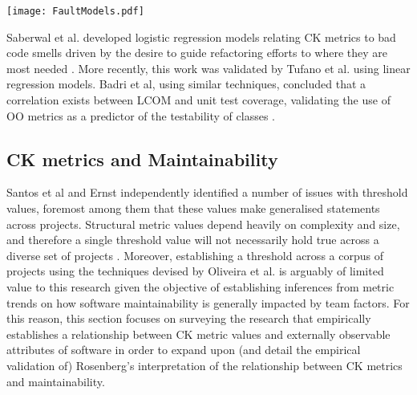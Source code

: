 \begin{table}
\begin{tabular}
 \centering 
 \texttt{[image: FaultModels.pdf]}
 \label{tab:FaultModels}
\end{tabular}
\end{table}

Saberwal et al. developed logistic regression models relating CK metrics to bad code smells driven by the desire to guide refactoring efforts to where they are most needed \citep{saberwal2013empirical}. More recently, this work was validated by Tufano et al. \citep{tufano2017and} using linear regression models. Badri et al, using similar techniques, concluded that a correlation exists between LCOM and unit test coverage, validating the use of OO metrics as a predictor of the testability of classes \citep{badri2011empirical}.

\subsection{CK metrics and Maintainability}
Santos et al and Ernst independently identified a number of issues with threshold values, foremost among them that these values make generalised statements across projects. Structural metric values depend heavily on complexity and size, and therefore a single threshold value will not necessarily hold true across a diverse set of projects \citep{Santos2017AnES, ernst2018bayesian}. Moreover, establishing a threshold across a corpus of projects using the techniques devised by Oliveira et al. is arguably of limited value to this research given the objective of establishing inferences from metric trends on how software maintainability is generally impacted by team factors. For this reason, this section focuses on surveying the research that empirically establishes a relationship between CK metric values and externally observable attributes of software in order to expand upon (and detail the empirical validation of) Rosenberg's interpretation of the relationship between CK metrics and maintainability.

